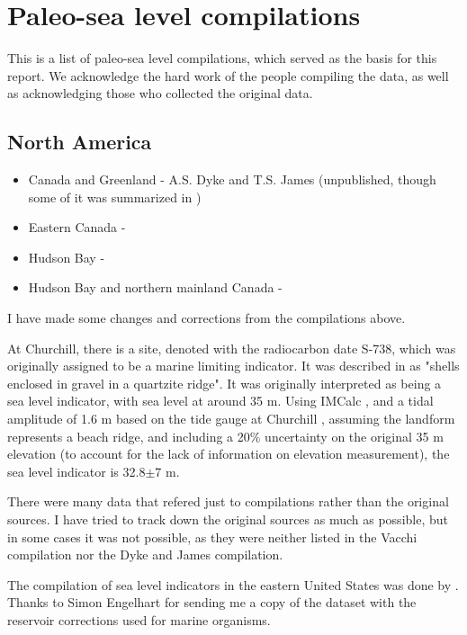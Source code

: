 \section{Paleo-sea level compilations}

This is a list of paleo-sea level compilations, which served as the basis for this report. We acknowledge the hard work of the people compiling the data, as well as acknowledging those who collected the original data.

\subsection{North America}

\begin{itemize}
  \item Canada and Greenland - A.S. Dyke and T.S. James (unpublished, though some of it was summarized in \citet{DykePeltier2000})
  \item Eastern Canada - \citet{VacchiEtal2018}
  \item Hudson Bay - \citet{SimonEtal2016}
  \item Hudson Bay and northern mainland Canada - \citet{GowanEtal2016}
\end{itemize}

I have made some changes and corrections from the compilations above.

At Churchill, there is a site, denoted with the radiocarbon date S-738, which was originally assigned to be a marine limiting indicator. It was described in \citet{MorlanEtal2000} as "shells enclosed in gravel in a quartzite ridge". It was originally interpreted as being a sea level indicator, with sea level at around 35 m. Using IMCalc  \citep{LorscheidRovere2019}, and a tidal amplitude of 1.6 m based on the tide gauge at Churchill \citep{Ray2016}, assuming the landform represents a beach ridge, and including a 20\% uncertainty on the original 35 m elevation (to account for the lack of information on elevation measurement), the sea level indicator is 32.8$\pm$7 m.

There were many data that refered just to compilations rather than the original sources. I have tried to track down the original sources as much as possible, but in some cases it was not possible, as they were neither listed in the Vacchi compilation nor the Dyke and James compilation.

The compilation of sea level indicators in the eastern United States was done by \citet{EngelhartHorton2012}. Thanks to Simon Engelhart for sending me a copy of the dataset with the reservoir corrections used for marine organisms.

